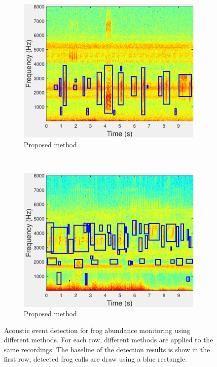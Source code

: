 \begin{figure}
                \begin{subfigure}[b]{0.35\textwidth}
       \includegraphics[width=\textwidth]{image/Ch7/AED_Jie.pdf}
                \caption{Proposed method}
        \end{subfigure}     
~
        \begin{subfigure}[b]{0.35\textwidth}
       \includegraphics[width=\textwidth]{image/Ch7/AED_Jie_2.pdf}
                \caption{Proposed method}
        \end{subfigure}                
        \caption[Acoustic event detection for frog abundance monitoring using different methods]{Acoustic event detection for frog abundance monitoring using different methods. For each row, different methods are applied to the same recordings. The baseline of the detection results is show in the first row; detected frog calls are draw using a blue rectangle.}        
        \label{fig:Ch7_AED}
\end{figure}

